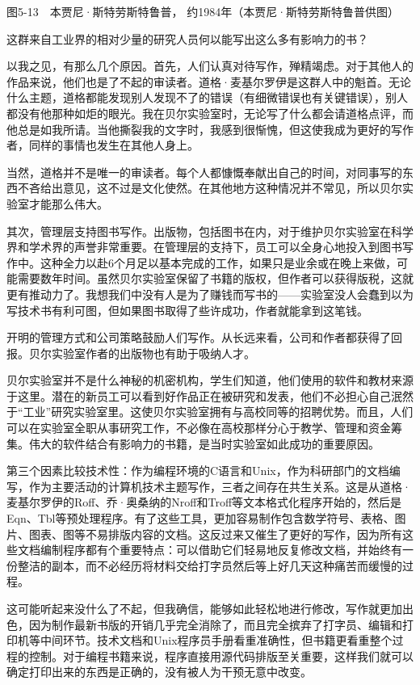 \documentclass[a4paper,12pt,UTF8,twoside]{ctexbook}
\begin{document}
{{图5-13　本贾尼·斯特劳斯特鲁普， 约1984年（本贾尼·斯特劳斯特鲁普供图）

这群来自工业界的相对少量的研究人员何以能写出这么多有影响力的书？

以我之见，有那么几个原因。首先，人们认真对待写作，殚精竭虑。对于其他人的作品来说，他们也是了不起的审读者。道格·麦基尔罗伊是这群人中的魁首。无论什么主题，道格都能发现别人发现不了的错误（有细微错误也有关键错误），别人都没有他那种如炬的眼光。我在贝尔实验室时，无论写了什么都会请道格点评，而他总是如我所请。当他撕裂我的文字时，我感到很惭愧，但这使我成为更好的写作者，同样的事情也发生在其他人身上。

当然，道格并不是唯一的审读者。每个人都慷慨奉献出自己的时间，对同事写的东西不吝给出意见，这不过是文化使然。在其他地方这种情况并不常见，所以贝尔实验室才能那么伟大。

其次，管理层支持图书写作。出版物，包括图书在内，对于维护贝尔实验室在科学界和学术界的声誉非常重要。在管理层的支持下，员工可以全身心地投入到图书写作中。这种全力以赴6个月足以基本完成的工作，如果只是业余或在晚上来做，可能需要数年时间。虽然贝尔实验室保留了书籍的版权，但作者可以获得版税，这就更有推动力了。我想我们中没有人是为了赚钱而写书的——实验室没人会蠢到以为写技术书有利可图，但如果图书取得了些许成功，作者就能拿到这笔钱。

开明的管理方式和公司策略鼓励人们写作。从长远来看，公司和作者都获得了回报。贝尔实验室作者的出版物也有助于吸纳人才。

贝尔实验室并不是什么神秘的机密机构，学生们知道，他们使用的软件和教材来源于这里。潜在的新员工可以看到好作品正在被研究和发表，他们不必担心自己泯然于“工业”研究实验室里。这使贝尔实验室拥有与高校同等的招聘优势。而且，人们可以在实验室全职从事研究工作，不必像在高校那样分心于教学、管理和资金筹集。伟大的软件结合有影响力的书籍，是当时实验室如此成功的重要原因。

第三个因素比较技术性：作为编程环境的C语言和Unix，作为科研部门的文档编写，作为主要活动的计算机技术主题写作，三者之间存在共生关系。这是从道格·麦基尔罗伊的Roff、乔·奥桑纳的Nroff和Troff等文本格式化程序开始的，然后是Eqn、Tbl等预处理程序。有了这些工具，更加容易制作包含数学符号、表格、图片、图表、图等不易排版内容的文档。这反过来又催生了更好的写作，因为所有这些文档编制程序都有个重要特点：可以借助它们轻易地反复修改文档，并始终有一份整洁的副本，而不必经历将材料交给打字员然后等上好几天这种痛苦而缓慢的过程。

这可能听起来没什么了不起，但我确信，能够如此轻松地进行修改，写作就更加出色，因为制作最新书版的开销几乎完全消除了，而且完全摈弃了打字员、编辑和打印机等中间环节。技术文档和Unix程序员手册看重准确性，但书籍更看重整个过程的控制。对于编程书籍来说，程序直接用源代码排版至关重要，这样我们就可以确定打印出来的东西是正确的，没有被人为干预无意中改变。

}}
\end{document}
